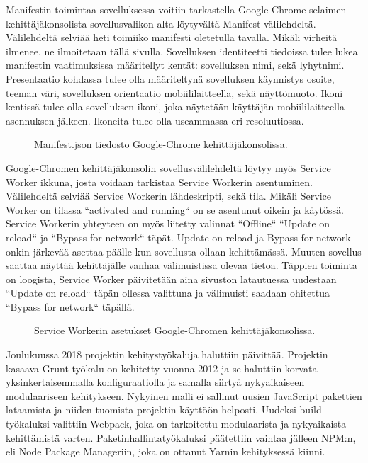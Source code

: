 \documentclass{tktltiki}
\begin{document}
Manifestin toimintaa sovelluksessa voitiin tarkastella Google-Chrome selaimen kehittäjäkonsolista sovellusvalikon alta löytyvältä Manifest välilehdeltä. Välilehdeltä selviää heti toimiiko manifesti oletetulla tavalla. Mikäli virheitä ilmenee, ne ilmoitetaan tällä sivulla. Sovelluksen identiteetti tiedoissa tulee lukea manifestin vaatimuksissa määritellyt kentät: sovelluksen nimi, sekä lyhytnimi. Presentaatio kohdassa tulee olla määriteltynä sovelluksen käynnistys osoite, teeman väri, sovelluksen orientaatio mobiililaitteella, sekä näyttömuoto. Ikoni kentissä tulee olla sovelluksen ikoni, joka näytetään käyttäjän mobiililaitteella asennuksen jälkeen. Ikoneita tulee olla useammassa eri resoluutiossa. 

\begin{figure}[h]
\begin{center}
\caption{Manifest.json tiedosto Google-Chrome kehittäjäkonsolissa.}
\label{Manifest.json}
\end{center}
\end{figure}
\clearpage

Google-Chromen kehittäjäkonsolin sovellusvälilehdeltä löytyy myös Service Worker ikkuna, josta voidaan tarkistaa Service Workerin asentuminen. Välilehdeltä selviää Service Workerin lähdeskripti, sekä tila. Mikäli Service Worker on tilassa “activated and running“ on se asentunut oikein ja käytössä. Service Workerin yhteyteen on myös liitetty valinnat “Offline“ “Update on reload“ ja “Bypass for network“ täpät. Update on reload ja Bypass for network onkin järkevää asettaa päälle kun sovellusta ollaan kehittämässä. Muuten sovellus saattaa näyttää kehittäjälle vanhaa välimuistissa olevaa tietoa. Täppien toiminta on loogista, Service Worker päivitetään aina sivuston latautuessa uudestaan “Update on reload“ täpän ollessa valittuna ja välimuisti saadaan ohitettua “Bypass for network“ täpällä.

\begin{figure}[h]
\begin{center}
\caption{Service Workerin asetukset Google-Chromen kehittäjäkonsolissa.}
\label{Service Worker}
\end{center}
\end{figure}

Joulukuussa 2018 projektin kehitystyökaluja haluttiin päivittää. Projektin kasaava Grunt työkalu on kehitetty vuonna 2012 ja se haluttiin korvata yksinkertaisemmalla konfiguraatiolla ja samalla siirtyä nykyaikaiseen modulaariseen kehitykseen. Nykyinen malli ei sallinut uusien JavaScript pakettien lataamista ja niiden tuomista projektin käyttöön helposti. Uudeksi build työkaluksi valittiin Webpack, joka on tarkoitettu modulaarista ja nykyaikaista kehittämistä varten. Paketinhallintatyökaluksi päätettiin vaihtaa jälleen NPM:n, eli Node Package Manageriin, joka on ottanut Yarnin kehityksessä kiinni. 
\end{document}
